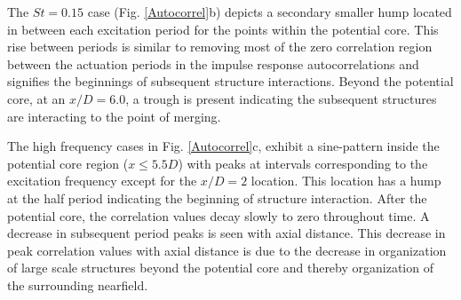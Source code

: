 \documentclass[english]{aiaa-tc}
\begin{document}
The $St=0.15$ case (Fig. \ref{Autocorrel}b) depicts a secondary smaller hump located in between each excitation period for the points within the potential core. This rise between periods is similar to removing most of the zero correlation region between the actuation periods in the impulse response autocorrelations and signifies the beginnings of subsequent structure interactions. Beyond the potential core, at an $x/D=6.0$, a trough is present indicating the subsequent structures are interacting to the point of merging. %

The high frequency cases in Fig. \ref{Autocorrel}c, exhibit a sine-pattern inside the potential core region ($x\leq5.5D$) with peaks at intervals corresponding to the excitation frequency except for the $x/D=2$ location. This location has a hump at the half period indicating the beginning of structure interaction. After the potential core, the correlation values decay slowly to zero throughout time. A decrease in subsequent period peaks is seen with axial distance. This decrease in peak correlation values with axial distance is due to the decrease in organization of large scale structures beyond the potential core and thereby organization of the surrounding nearfield. %
\end{document}
